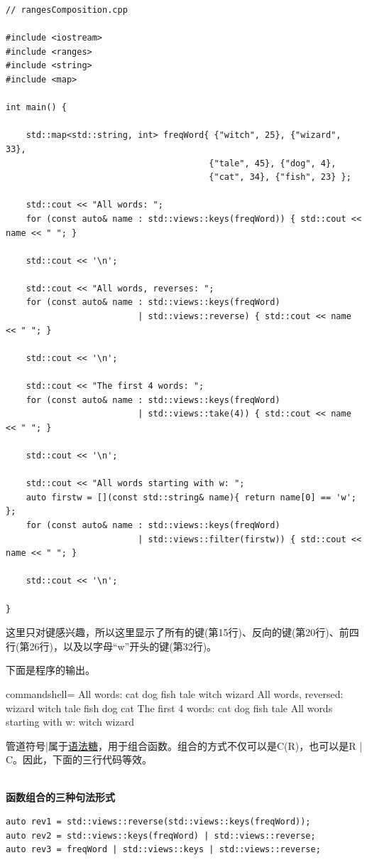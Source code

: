 \begin{lstlisting}[style=styleCXX]
// rangesComposition.cpp

#include <iostream>
#include <ranges>
#include <string>
#include <map>

int main() {
	
	std::map<std::string, int> freqWord{ {"witch", 25}, {"wizard", 33},
										{"tale", 45}, {"dog", 4},
										{"cat", 34}, {"fish", 23} };
	
	std::cout << "All words: ";
	for (const auto& name : std::views::keys(freqWord)) { std::cout << name << " "; }
	
	std::cout << '\n';
	
	std::cout << "All words, reverses: ";
	for (const auto& name : std::views::keys(freqWord)
	                      | std::views::reverse) { std::cout << name << " "; }
	
	std::cout << '\n';
	
	std::cout << "The first 4 words: ";
	for (const auto& name : std::views::keys(freqWord)
	                      | std::views::take(4)) { std::cout << name << " "; }
	
	std::cout << '\n';
	
	std::cout << "All words starting with w: ";
	auto firstw = [](const std::string& name){ return name[0] == 'w'; };
	for (const auto& name : std::views::keys(freqWord)
	                      | std::views::filter(firstw)) { std::cout << name << " "; }
	
	std::cout << '\n';

}
\end{lstlisting}

这里只对键感兴趣，所以这里显示了所有的键(第15行)、反向的键(第20行)、前四行(第26行)，以及以字母“w”开头的键(第32行)。

下面是程序的输出。

\begin{tcblisting}{commandshell={}}
All words: cat dog fish tale witch wizard
All words, reversed: wizard witch tale fish dog cat
The first 4 words: cat dog fish tale
All words starting with w: witch wizard
\end{tcblisting}

管道符号|属于\href{https://en.wikipedia.org/wiki/Syntactic_sugar}{语法糖}，用于组合函数。组合的方式不仅可以是C(R)，也可以是R | C。因此，下面的三行代码等效。

\hspace*{\fill} \\ %
\noindent
\textbf{函数组合的三种句法形式}
\begin{lstlisting}[style=styleCXX]
auto rev1 = std::views::reverse(std::views::keys(freqWord));
auto rev2 = std::views::keys(freqWord) | std::views::reverse;
auto rev3 = freqWord | std::views::keys | std::views::reverse;
\end{lstlisting}

